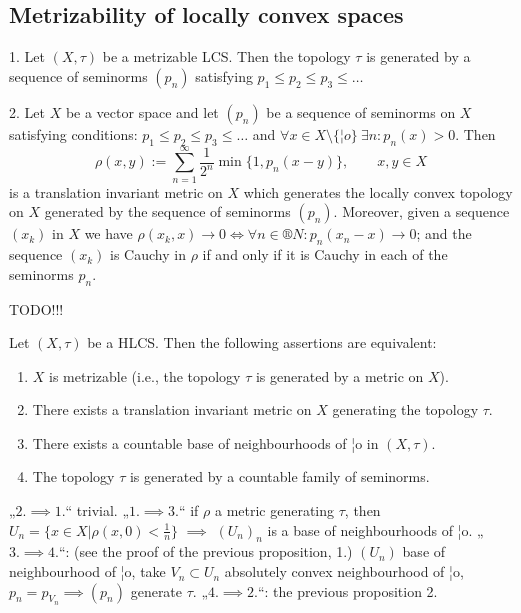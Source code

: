 \documentclass[12pt]{article}					%
\begin{document}
\subsection{Metrizability of locally convex spaces}

\begin{tvrzeni}
	1. Let $(X, τ)$ be a metrizable LCS. Then the topology $τ$ is generated by a sequence of seminorms $(p_n)$ satisfying $p_1 ≤ p_2 ≤ p_3 ≤ …$

	2. Let $X$ be a vector space and let $(p_n)$ be a sequence of seminorms on $X$ satisfying conditions: $p_1 ≤ p_2 ≤ p_3 ≤ …$ and $\forall x \in X \setminus \{¦o\}\ \exists n: p_n(x) > 0$. Then
	$$ ρ(x, y) := \sum_{n=1}^∞ \frac{1}{2^n} \min\{1, p_n(x - y)\}, \qquad x, y \in X $$
	is a translation invariant metric on $X$ which generates the locally convex topology on $X$ generated by the sequence of seminorms $(p_n)$. Moreover, given a sequence $(x_k)$ in $X$ we have $ρ(x_k, x) \rightarrow 0 \Leftrightarrow \forall n \in ®N: p_n(x_n - x) \rightarrow 0$; and the sequence $(x_k)$ is Cauchy in $ρ$ if and only if it is Cauchy in each of the seminorms $p_n$.

	\begin{dukazin}
		TODO!!!
	\end{dukazin}
\end{tvrzeni}

\begin{veta}
	Let $(X, τ)$ be a HLCS. Then the following assertions are equivalent:

	\begin{enumerate}
		\item $X$ is metrizable (i.e., the topology $τ$ is generated by a metric on $X$).
		\item There exists a translation invariant metric on $X$ generating the topology $τ$.
		\item There exists a countable base of neighbourhoods of ¦o in $(X, τ)$.
		\item The topology $τ$ is generated by a countable family of seminorms.
	\end{enumerate}


	\begin{dukazin}
		„$2. \implies 1.$“ trivial. „$1. \implies 3.$“ if $ρ$ a metric generating $τ$, then $U_n = \{x \in X | ρ(x, 0) < \frac{1}{n}\}$ $\implies$ $(U_n)_n$ is a base of neighbourhoods of ¦o. „$3. \implies 4.$“: (see the proof of the previous proposition, 1.) $(U_n)$ base of neighbourhood of ¦o, take $V_n \subset U_n$ absolutely convex neighbourhood of ¦o, $p_n = p_{V_n} \implies (p_n)$ generate $τ$. „$4. \implies 2.$“: the previous proposition 2.
	\end{dukazin}
\end{veta}
\end{document}

